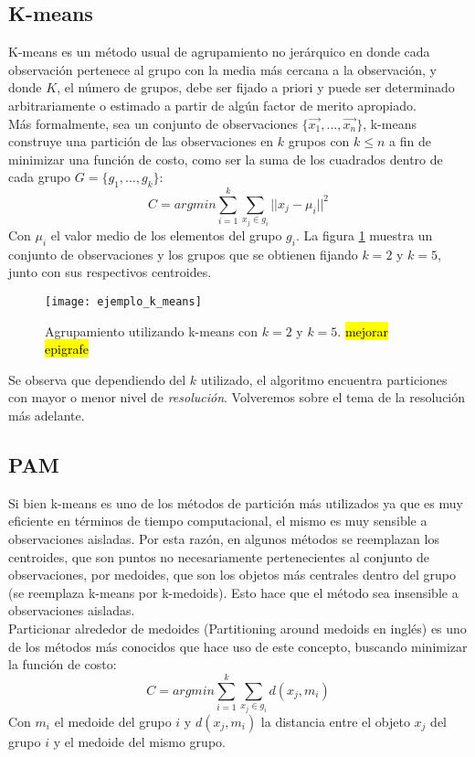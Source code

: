 \subsection{K-means}
K-means es un método usual de agrupamiento no jerárquico en donde cada observación pertenece al grupo con la media más cercana a la observación, y donde $K$, el número de grupos, debe ser fijado a priori y puede ser determinado arbitrariamente o estimado a partir de algún factor de merito apropiado.\cite{Hartigan1979}\\
Más formalmente, sea un conjunto de observaciones $\{\vec{x_1},...,\vec{x_n}\}$, k-means construye una partición de las observaciones en $k$ grupos con $k \leq n$ a fin de minimizar una función de costo, como ser la suma de los cuadrados dentro de cada grupo $G = \{g_1,...,g_k\}$: 
\begin{equation}
	C = argmin\sum\limits_{i=1}^k \sum\limits_{x_j \in g_i}||x_j-\mu_i||^2
\end{equation}
Con $\mu_i$ el valor medio de los elementos del grupo $g_i$.
La figura \ref{fig:ejemplo_k_means} muestra un conjunto de observaciones y los grupos que se obtienen fijando $k=2$ y $k=5$, junto con sus respectivos centroides.
\begin{figure}[h]
    \centering
    \texttt{[image: ejemplo\_k\_means]}
    \caption{Agrupamiento utilizando k-means con $k=2$ y $k=5$. \hl{mejorar epigrafe}}
    \label{fig:ejemplo_k_means}
\end{figure}
Se observa que dependiendo del $k$ utilizado, el algoritmo encuentra particiones con mayor o menor nivel de \textit{resolución}. Volveremos sobre el tema de la resolución más adelante.
\cite{Kogan2006}

\subsection{PAM}
Si bien k-means es uno de los métodos de partición más utilizados ya que es muy eficiente en términos de tiempo computacional, el mismo es muy sensible a observaciones aisladas. Por esta razón, en algunos métodos se reemplazan los centroides, que son puntos no necesariamente pertenecientes al conjunto de observaciones, por medoides, que son los objetos más centrales dentro del grupo (se reemplaza k-means por k-medoids). Esto hace que el método sea insensible a observaciones aisladas.\\
Particionar alrededor de medoides (Partitioning around medoids en inglés) es uno de los métodos más conocidos que hace uso de este concepto, buscando minimizar la función de costo:
\begin{equation}
	C = argmin\sum\limits_{i=1}^k \sum\limits_{x_j \in g_i} d(x_j, m_i)
\end{equation}
Con $m_i$ el medoide del grupo $i$ y $d(x_j, m_i)$ la distancia entre el objeto $x_j$ del grupo $i$ y el medoide del mismo grupo.
\cite{Park2009, Ibrahim2012}
